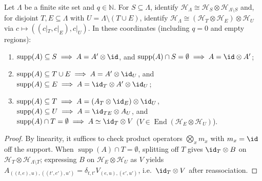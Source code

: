 \begin{lemma}
    \label{lem:peps_frame_split_forms}
    \leanok
    Let $\Lambda$ be a finite site set and $q\in\mathbb N$. For
    $S\subseteq\Lambda$, identify $\mathcal H_\Lambda\cong\mathcal H_S\otimes\mathcal H_{\Lambda\setminus S}$
    and, for disjoint $T,E\subseteq\Lambda$ with
    $U=\Lambda\setminus(T\cup E)$, identify $\mathcal H_\Lambda\cong(\mathcal H_T\otimes\mathcal H_E)\otimes
        \mathcal H_U$ via $c\mapsto((c|_T,c|_E),c|_U)$. In these coordinates
    (including $q=0$ and empty regions):
    \begin{enumerate}
        \item $\operatorname{supp}(A)\subseteq S\implies A=A'\otimes\id$, and
              $\operatorname{supp}(A)\cap S=\emptyset\implies A=\id\otimes A'$;
        \item $\operatorname{supp}(A)\subseteq T\cup E\implies A=A'\otimes\id_U$,
              and $\operatorname{supp}(A)\subseteq E\implies A=\id_T\otimes A'\otimes\id_U$;
        \item $\operatorname{supp}(A)\subseteq T\implies A=(A_T\otimes\id_E)\otimes\id_U$,
              $\operatorname{supp}(A)\subseteq U\implies A=\id_{TE}\otimes A_U$, and
              $\operatorname{supp}(A)\cap T=\emptyset\implies A\simeq\id_T\otimes V$
              ($V\in\operatorname{End}(\mathcal H_E\otimes\mathcal H_U)$).
    \end{enumerate}
\end{lemma}

\begin{proof}\leanok
    By linearity, it suffices to check product operators $\bigotimes_xm_x$ with
    $m_x=\id$ off the support. When $\operatorname{supp}(A)\cap T=\emptyset$,
    splitting off $T$ gives $\id_T\otimes B$ on
    $\mathcal H_T\otimes\mathcal H_{\Lambda\setminus T}$; expressing $B$ on
    $\mathcal H_E\otimes\mathcal H_U$ as $V$ yields
    $A_{((t,e),u),((t',e'),u')}=\delta_{t,t'}V_{(e,u),(e',u')}$, i.e.\
    $\id_T\otimes V$ after reassociation.
\end{proof}

